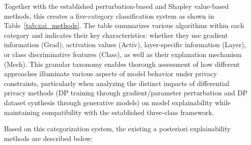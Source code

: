 \documentclass{article}
\begin{document}
Together with the established perturbation-based and Shapley value-based methods, this creates a five-category classification system as shown in Table~\ref{tab:xai_methods}. The table summarizes various algorithms within each category and indicates their key characteristics: whether they use gradient information (Grad), activation values (Activ), layer-specific information (Layer), or class discriminative features (Class), as well as their explanation mechanism (Mech). This granular taxonomy enables thorough assessment of how different approaches illuminate various aspects of model behavior under privacy constraints, particularly when analyzing the distinct impacts of differential privacy methods (DP training through gradient/parameter perturbation and DP dataset synthesis through generative models) on model explainability while maintaining compatibility with the established three-class framework.


Based on this categorization system, the existing a posteriori explainability methods are described below:
\end{document}
